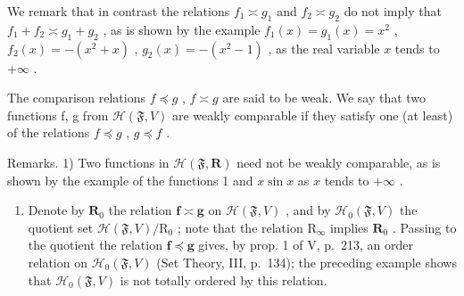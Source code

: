 We remark that in contrast the relations \(f_{1} \asymp g_{1}\) and \(f_{2} \asymp g_{2}\) do not imply that \(f_{1} + f_{2} \asymp g_{1} + g_{2}\) , as is shown by the example \(f_{1}(x) = g_{1}(x) = x^{2}\) , \(f_{2}(x) = -(x^{2} + x)\) , \(g_{2}(x) = -(x^{2} - 1)\) , as the real variable \(x\) tends to \(+\infty\) .

The comparison relations \(f \preccurlyeq g\) , \(f \asymp g\) are said to be weak. We say that two functions f, g from \(\mathcal{H}(\mathfrak{F}, V)\) are weakly comparable if they satisfy one (at least) of the relations \(f \preccurlyeq g\) , \(g \preccurlyeq f\) .

Remarks. 1) Two functions in \(\mathcal{H}(\mathfrak{F},\mathbf{R})\) need not be weakly comparable, as is shown by the example of the functions 1 and \(x\sin x\) as \(x\) tends to \(+\infty\) .

\begin{enumerate}
\def\labelenumi{\arabic{enumi})}
\setcounter{enumi}{1}
\tightlist
\item
  Denote by \(\mathbf{R}_0\) the relation \(\mathbf{f} \asymp \mathbf{g}\) on \(\mathcal{H}(\mathfrak{F}, V)\) , and by \(\mathcal{H}_0(\mathfrak{F}, V)\) the quotient set \(\mathcal{H}(\mathfrak{F}, V)/\mathrm{R}_0\) ; note that the relation \(\mathrm{R}_{\infty}\) implies \(\mathbf{R}_0\) . Passing to the quotient the relation \(\mathbf{f} \preccurlyeq \mathbf{g}\) gives, by prop. 1 of V, p.~213, an order relation on \(\mathcal{H}_0(\mathfrak{F}, V)\) (Set Theory, III, p.~134); the preceding example shows that \(\mathcal{H}_0(\mathfrak{F}, V)\) is not totally ordered by this relation.
\end{enumerate}

